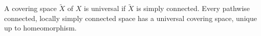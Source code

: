 A covering space $\tilde{X}$ of $X$ is universal if $\tilde{X}$ is simply connected. Every pathwise connected, locally simply connected space has a universal covering space, unique up to homeomorphism.
